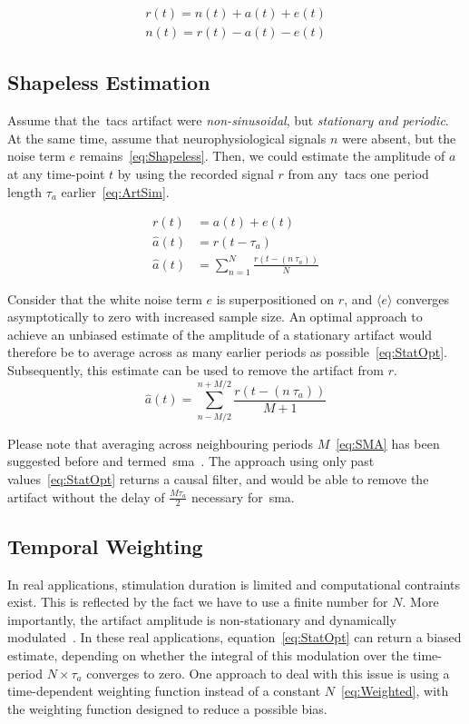 \documentclass[a4paper]{article}
\begin{document}
\begin{eqnarray}
    r(t) = n(t) + a(t) + e(t)\\
    n(t) = r(t) - a(t) - e(t)
\end{eqnarray}

\subsection{Shapeless Estimation}
Assume that the~\gls{tacs} artifact were \emph{non-sinusoidal}, but \emph{stationary and periodic}. At the same time, assume that neurophysiological signals $n$ were absent, but the noise term $e$ remains~\eqref{eq:Shapeless}. Then, we could estimate the amplitude of $a$ at any time-point $t$ by using the recorded signal $r$ from any~\gls{tacs} one period length $\tau_a$ earlier~\eqref{eq:ArtSim}.

\begin{align}
    r(t) & = a(t) + e(t)\label{eq:Shapeless}\\
    \hat{a}(t) & = r(t-\tau_a)\label{eq:ArtSim}\\
    \hat{a}(t) & = \sum_{n=1}^{N} \frac{r(t - (n~\tau_a))}{N}\label{eq:StatOpt}
\end{align}

Consider that the white noise term $e$ is superpositioned on $r$, and  $\langle e\rangle$ converges asymptotically to zero with increased sample size. An optimal approach to achieve an unbiased estimate of the amplitude of a stationary artifact would therefore be to average across as many earlier periods as possible~\eqref{eq:StatOpt}. Subsequently, this estimate can be used to  remove the artifact from $r$.
\begin{equation}
    \hat{a}(t) = \sum_{n-M/2}^{n+M/2} \frac{r(t - (n~\tau_a))}{M+1}\label{eq:SMA}
\end{equation}

Please note that averaging across neighbouring periods $M$~\eqref{eq:SMA} has been suggested before and termed~\gls{sma}~\citep{Kohli_2015}. The approach using only past values~\eqref{eq:StatOpt} returns a causal filter, and would be able to remove the artifact without the delay of $\frac{M \tau_a}{2}$ necessary for~\gls{sma}.

\subsection{Temporal Weighting}

In real applications, stimulation duration is limited and computational contraints exist. This is reflected by the fact we have to use a finite number for $N$. More importantly, the artifact amplitude is non-stationary  and dynamically modulated~\citep{Noury_2016}.
In these real applications, equation~\eqref{eq:StatOpt} can return a biased estimate, depending on whether the integral of this modulation over the time-period $N\times\tau_a$ converges to zero.
One approach to deal with this issue is using a time-dependent weighting function instead of a constant $N$~\eqref{eq:Weighted}, with the weighting function designed to reduce a possible bias.
\end{document}
